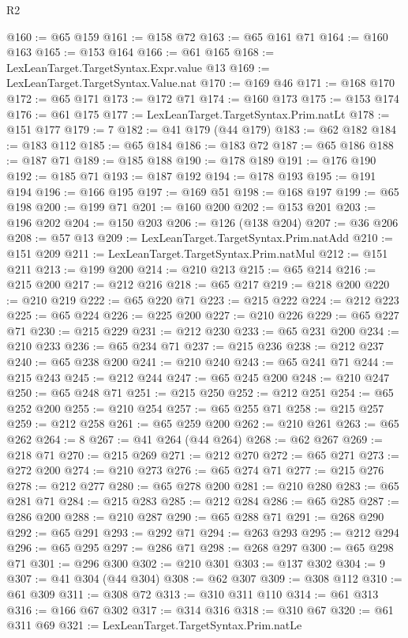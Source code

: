 \begin{lexlean}{R2}
\begin{coremodule}
@160 := @65 @159
@161 := @158 @72
@163 := @65 @161 @71
@164 := @160 @163
@165 := @153 @164
@166 := @61 @165
@168 := LexLeanTarget.TargetSyntax.Expr.value @13
@169 := LexLeanTarget.TargetSyntax.Value.nat
@170 := @169 @46
@171 := @168 @170
@172 := @65 @171
@173 := @172 @71
@174 := @160 @173
@175 := @153 @174
@176 := @61 @175
@177 := LexLeanTarget.TargetSyntax.Prim.natLt
@178 := @151 @177
@179 := 7
@182 := @41 @179 (@44 @179)
@183 := @62 @182
@184 := @183 @112
@185 := @65 @184
@186 := @183 @72
@187 := @65 @186
@188 := @187 @71
@189 := @185 @188
@190 := @178 @189
@191 := @176 @190
@192 := @185 @71
@193 := @187 @192
@194 := @178 @193
@195 := @191 @194
@196 := @166 @195
@197 := @169 @51
@198 := @168 @197
@199 := @65 @198
@200 := @199 @71
@201 := @160 @200
@202 := @153 @201
@203 := @196 @202
@204 := @150 @203
@206 := @126 (@138 @204)
@207 := @36 @206
@208 := @57 @13
@209 := LexLeanTarget.TargetSyntax.Prim.natAdd
@210 := @151 @209
@211 := LexLeanTarget.TargetSyntax.Prim.natMul
@212 := @151 @211
@213 := @199 @200
@214 := @210 @213
@215 := @65 @214
@216 := @215 @200
@217 := @212 @216
@218 := @65 @217
@219 := @218 @200
@220 := @210 @219
@222 := @65 @220 @71
@223 := @215 @222
@224 := @212 @223
@225 := @65 @224
@226 := @225 @200
@227 := @210 @226
@229 := @65 @227 @71
@230 := @215 @229
@231 := @212 @230
@233 := @65 @231 @200
@234 := @210 @233
@236 := @65 @234 @71
@237 := @215 @236
@238 := @212 @237
@240 := @65 @238 @200
@241 := @210 @240
@243 := @65 @241 @71
@244 := @215 @243
@245 := @212 @244
@247 := @65 @245 @200
@248 := @210 @247
@250 := @65 @248 @71
@251 := @215 @250
@252 := @212 @251
@254 := @65 @252 @200
@255 := @210 @254
@257 := @65 @255 @71
@258 := @215 @257
@259 := @212 @258
@261 := @65 @259 @200
@262 := @210 @261
@263 := @65 @262
@264 := 8
@267 := @41 @264 (@44 @264)
@268 := @62 @267
@269 := @218 @71
@270 := @215 @269
@271 := @212 @270
@272 := @65 @271
@273 := @272 @200
@274 := @210 @273
@276 := @65 @274 @71
@277 := @215 @276
@278 := @212 @277
@280 := @65 @278 @200
@281 := @210 @280
@283 := @65 @281 @71
@284 := @215 @283
@285 := @212 @284
@286 := @65 @285
@287 := @286 @200
@288 := @210 @287
@290 := @65 @288 @71
@291 := @268 @290
@292 := @65 @291
@293 := @292 @71
@294 := @263 @293
@295 := @212 @294
@296 := @65 @295
@297 := @286 @71
@298 := @268 @297
@300 := @65 @298 @71
@301 := @296 @300
@302 := @210 @301
@303 := @137 @302
@304 := 9
@307 := @41 @304 (@44 @304)
@308 := @62 @307
@309 := @308 @112
@310 := @61 @309
@311 := @308 @72
@313 := @310 @311 @110
@314 := @61 @313
@316 := @166 @67 @302
@317 := @314 @316
@318 := @310 @67
@320 := @61 @311 @69
@321 := LexLeanTarget.TargetSyntax.Prim.natLe

\end{coremodule}
\end{lexlean}
